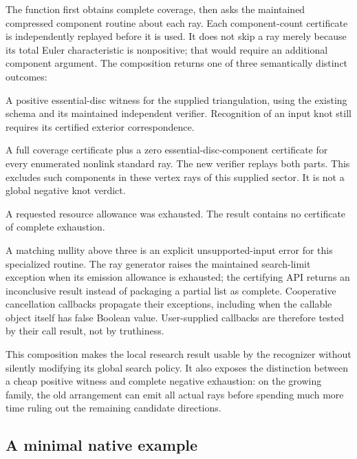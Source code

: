 The function  first obtains complete
coverage, then asks the maintained compressed component routine
about each ray.  Each component-count certificate is independently
replayed before it is used.  It does not skip a ray merely because
its total Euler characteristic is nonpositive; that would require
an additional component argument.  The composition returns one of
three semantically distinct outcomes:

\medskip
\noindent\textbf{}\par
A positive essential-disc witness for the supplied triangulation,
using the existing  schema and its
maintained independent verifier.  Recognition of an input knot
still requires its certified exterior correspondence.
\medskip
\noindent\textbf{}\par
A full coverage certificate plus a zero essential-disc-component
certificate for every enumerated nonlink standard ray.  The new
 verifier replays both
parts.  This excludes such components in these vertex rays of
this supplied sector.  It is not a global negative knot verdict.
\medskip
\noindent\textbf{}\par
A requested resource allowance was exhausted.  The result contains
no certificate of complete exhaustion.
\medskip

A matching nullity above three is an explicit unsupported-input
error for this specialized routine.  The ray generator raises the
maintained search-limit exception when its emission allowance is
exhausted; the certifying API returns an inconclusive result instead
of packaging a partial list as complete.  Cooperative cancellation
callbacks propagate their exceptions, including when the callable
object itself has false Boolean value.  User-supplied callbacks
are therefore tested by their call result, not by truthiness.

This composition makes the local research result usable by the
recognizer without silently modifying its global search policy.
It also exposes the distinction between a cheap positive witness
and complete negative exhaustion: on the growing family, the old
arrangement can emit all actual rays before spending much more
time ruling out the remaining candidate directions.

\subsection{A minimal native example}


